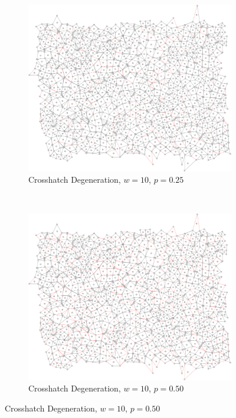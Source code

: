 \documentclass[a4paper,11pt,twoside]{report}
\begin{document}
\begin{figure}[htp]
\centering
\begin{subfigure}[t]{0.4\textwidth}
  \includegraphics[width=\textwidth]{ch6_figs/cross_hatch_p25_w10}
  \caption{Crosshatch Degeneration, $w=10$, $p=0.25$}

\end{subfigure}
~
\begin{subfigure}[t]{0.4\textwidth}
  \centering
  \includegraphics[width=\textwidth]{ch6_figs/cross_hatch_p50_w10}
  \caption{Crosshatch Degeneration, $w=10$, $p=0.50$}


\end{subfigure}
\end{figure}
\end{document}
